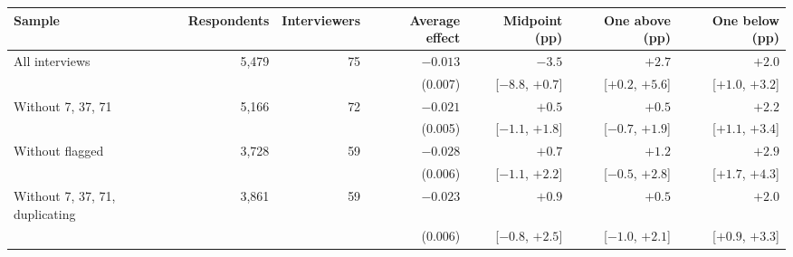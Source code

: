 \begin{tabular}{lrrrrrr}
\toprule
Sample & Respondents & Interviewers & Average effect & Midpoint (pp) & One above (pp) & One below (pp) \\
\midrule
All interviews & 5,479 & 75 & $-0.013$ & $-3.5$ & $+2.7$ & $+2.0$ \\
 &  &  & (0.007) & [$-8.8$, $+0.7$] & [$+0.2$, $+5.6$] & [$+1.0$, $+3.2$] \\
\addlinespace
Without 7, 37, 71 & 5,166 & 72 & $-0.021$ & $+0.5$ & $+0.5$ & $+2.2$ \\
 &  &  & (0.005) & [$-1.1$, $+1.8$] & [$-0.7$, $+1.9$] & [$+1.1$, $+3.4$] \\
\addlinespace
Without flagged & 3,728 & 59 & $-0.028$ & $+0.7$ & $+1.2$ & $+2.9$ \\
 &  &  & (0.006) & [$-1.1$, $+2.2$] & [$-0.5$, $+2.8$] & [$+1.7$, $+4.3$] \\
\addlinespace
Without 7, 37, 71, duplicating & 3,861 & 59 & $-0.023$ & $+0.9$ & $+0.5$ & $+2.0$ \\
 &  &  & (0.006) & [$-0.8$, $+2.5$] & [$-1.0$, $+2.1$] & [$+0.9$, $+3.3$] \\
\bottomrule
\end{tabular}
